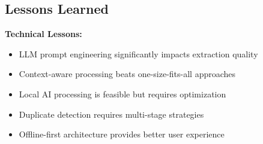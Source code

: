 \documentclass[11pt,a4paper]{report}
\begin{document}
\subsection{Lessons Learned}

\textbf{Technical Lessons:}
\begin{itemize}
    \item LLM prompt engineering significantly impacts extraction quality
    \item Context-aware processing beats one-size-fits-all approaches
    \item Local AI processing is feasible but requires optimization
    \item Duplicate detection requires multi-stage strategies
    \item Offline-first architecture provides better user experience
\end{itemize}
\end{document}
